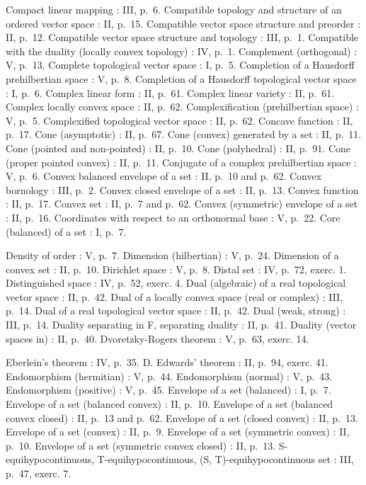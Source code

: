 Compact linear mapping : III, p.~6. Compatible topology and structure of an ordered vector space : II, p.~15. Compatible vector space structure and preorder : II, p.~12. Compatible vector space structure and topology : III, p.~1. Compatible with the duality (locally convex topology) : IV, p.~1. Complement (orthogonal) : V, p.~13. Complete topological vector space : I, p.~5. Completion of a Hausdorff prehilbertian space : V, p.~8. Completion of a Hausdorff topological vector space : I, p.~6. Complex linear form : II, p.~61. Complex linear variety : II, p.~61. Complex locally convex space : II, p.~62. Complexification (prehilbertian space) : V, p.~5. Complexified topological vector space : II, p.~62. Concave function : II, p.~17. Cone (asymptotic) : II, p.~67. Cone (convex) generated by a set : II, p.~11. Cone (pointed and non-pointed) : II, p.~10. Cone (polyhedral) : II, p.~91. Cone (proper pointed convex) : II, p.~11. Conjugate of a complex prehilbertian space : V, p.~6. Convex balanced envelope of a set : II, p.~10 and p.~62. Convex bornology : III, p.~2. Convex closed envelope of a set : II, p.~13. Convex function : II, p.~17. Convex set : II, p.~7 and p.~62. Convex (symmetric) envelope of a set : II, p.~16. Coordinates with respect to an orthonormal base : V, p.~22. Core (balanced) of a set : I, p.~7.

Density of order : V, p.~7. Dimension (hilbertian) : V, p.~24. Dimension of a convex set : II, p.~10. Dirichlet space : V, p.~8. Distal set : IV, p.~72, exerc. 1. Distinguished space : IV, p.~52, exerc. 4. Dual (algebraic) of a real topological vector space : II, p.~42. Dual of a locally convex space (real or complex) : III, p.~14. Dual of a real topological vector space : II, p.~42. Dual (weak, strong) : III, p.~14. Duality separating in F, separating duality : II, p.~41. Duality (vector spaces in) : II, p.~40. Dvoretzky-Rogers theorem : V, p.~63, exerc. 14.

Eberlein's theorem : IV, p.~35. D. Edwards' theorem : II, p.~94, exerc. 41. Endomorphism (hermitian) : V, p.~44. Endomorphism (normal) : V, p.~43. Endomorphism (positive) : V, p.~45. Envelope of a set (balanced) : I, p.~7. Envelope of a set (balanced convex) : II, p.~10. Envelope of a set (balanced convex closed) : II, p.~13 and p.~62. Envelope of a set (closed convex) : II, p.~13. Envelope of a set (convex) : II, p.~9. Envelope of a set (symmetric convex) : II, p.~10. Envelope of a set (symmetric convex closed) : II, p.~13. S-equihypocontinuous, T-equihypocontinuous, (S, T)-equihypocontinuous set : III, p.~47, exerc. 7.

